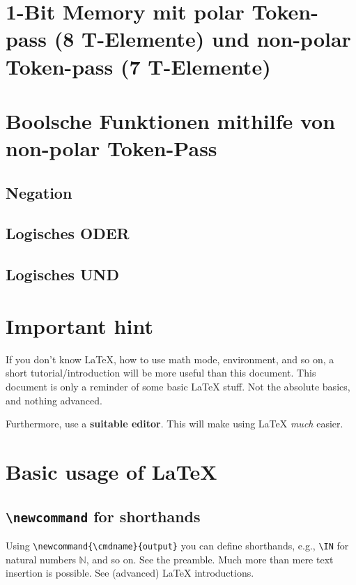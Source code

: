 \documentclass[11pt]{scrartcl}
\theoremstyle{plain} %
\theoremstyle{definition} %
\theoremstyle{remark} %
\newcommand{\IN}{\mathbb{N}} %
\begin{document}
\section{1-Bit Memory mit polar Token-pass (8 T-Elemente) und non-polar Token-pass (7 T-Elemente)}


\section{Boolsche Funktionen mithilfe von non-polar Token-Pass}

\subsection{Negation}

\subsection{Logisches ODER}

\subsection{Logisches UND}






\section{Important hint}

If you don't know \LaTeX{}, how to use math mode, environment, and so on,
a short tutorial/introduction will be more useful than this document.
This document is only a reminder of some basic \LaTeX{} stuff.
Not the absolute basics, and nothing advanced.

Furthermore, use a \textbf{suitable editor}.
This will make using \LaTeX{} \emph{much} easier.

\section{Basic usage of \LaTeX}
\label{sec:math-and-env}


\subsection{{\texttt{\textbackslash{}newcommand} for shorthands}}
\label{subsec:newcommand}

Using \verb|\newcommand{\cmdname}{output}| you can define shorthands,
e.g., \verb|\IN| for natural numbers $\IN$, and so on.
See the preamble.
Much more than mere text insertion is possible.
See (advanced) \LaTeX{} introductions.
\end{document}
